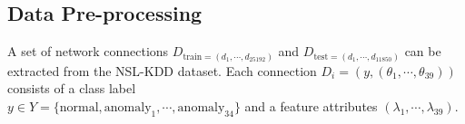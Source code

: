 
\subsection{Data Pre-processing}
\label{subsec:preprocessing}
A set of network connections $D_{\text{train}=(d_1, \cdots, d_{25192})}$ and $D_{\text{test}=(d_1, \cdots, d_{11850})}$ can be extracted from the NSL-KDD dataset. 
Each connection $D_i = (y, (\theta_{1}, \cdots, \theta_{39}))$ consists of a class label \\ 
$y \in Y=\{\text{normal},\text{anomaly}_1,\cdots,\text{anomaly}_{34}\}$ and a feature attributes $(\lambda_1,\cdots,\lambda_{39})$. 

